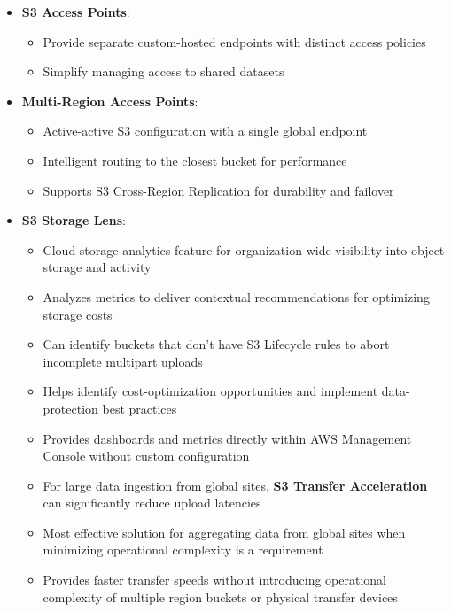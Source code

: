 \documentclass[11pt,a4paper]{report}
\begin{document}
\begin{itemize}
\begin{itemize}
  \item Provides a scalable, cost-effective solution for hosting websites with minimal operational overhead
  \item Eliminates the need to maintain and patch web servers or content management systems
\end{itemize}
  \item \textbf{S3 Access Points}:
\begin{itemize}
  \item Provide separate custom-hosted endpoints with distinct access policies
  \item Simplify managing access to shared datasets
\end{itemize}
  \item \textbf{Multi-Region Access Points}:
\begin{itemize}
  \item Active-active S3 configuration with a single global endpoint
  \item Intelligent routing to the closest bucket for performance
  \item Supports S3 Cross-Region Replication for durability and failover
\end{itemize}
  \item \textbf{S3 Storage Lens}:
\begin{itemize}
  \item Cloud-storage analytics feature for organization-wide visibility into object storage and activity
  \item Analyzes metrics to deliver contextual recommendations for optimizing storage costs
  \item Can identify buckets that don't have S3 Lifecycle rules to abort incomplete multipart uploads
  \item Helps identify cost-optimization opportunities and implement data-protection best practices
  \item Provides dashboards and metrics directly within AWS Management Console without custom configuration
  \item For large data ingestion from global sites, \textbf{S3 Transfer Acceleration} can significantly reduce upload latencies
  \item Most effective solution for aggregating data from global sites when minimizing operational complexity is a requirement
  \item Provides faster transfer speeds without introducing operational complexity of multiple region buckets or physical transfer devices

\end{itemize}
\end{itemize}
\end{document}
